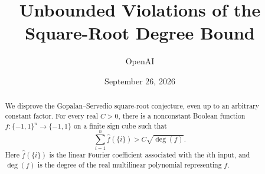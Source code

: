 \documentclass[11pt]{article}
\title{Unbounded Violations of the Square-Root Degree Bound}
\author{OpenAI}
\date{September 26, 2026}
\theoremstyle{remark}
\begin{document}
\maketitle

\begin{abstract}
We disprove the Gopalan--Servedio square-root conjecture, even up to an
arbitrary constant factor. For every real \(C>0\), there is a nonconstant
Boolean function \(f:\{-1,1\}^n\to\{-1,1\}\) on a finite sign cube such that
\[
\sum_{i=1}^n \widehat f(\{i\})>C\sqrt{\deg(f)}.
\]
Here \(\widehat f(\{i\})\) is the linear Fourier coefficient associated with
the \(i\)th input, and \(\deg(f)\) is the degree of the real multilinear
polynomial representing \(f\).
\end{abstract}






\appendix



\end{document}
